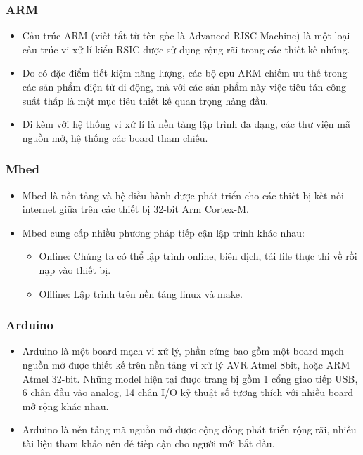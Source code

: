 \documentclass[a4paper,12pt,oneside]{article}
\begin{document}
\subsubsection{ARM \cite{arm}}
\begin{itemize}
\item Cấu trúc ARM (viết tắt từ tên gốc là Advanced RISC Machine) là một loại cấu trúc vi xử lí kiểu RSIC được sử dụng rộng rãi trong các thiết kế nhúng.
\item Do có đặc điểm tiết kiệm năng lượng, các bộ cpu ARM chiếm ưu thế trong các sản phẩm điện tử di động, mà với các sản phẩm này việc tiêu tán công suất thấp là một mục tiêu thiết kế quan trọng hàng đầu.
\item Đi kèm với hệ thống vi xử lí là nền tảng lập trình đa dạng, các thư viện mã nguồn mở, hệ thống các board tham chiếu.
\end{itemize}

\subsubsection{Mbed \cite{mbed}}
\begin{itemize}
\item Mbed là nền tảng và hệ điều hành được phát triển cho các thiết bị kết nối internet giữa trên các thiết bị 32-bit Arm Cortex-M.
\item Mbed cung cấp nhiều phương pháp tiếp cận lập trình khác nhau:
\begin{itemize}
	\item Online: Chúng ta có thể lập trình online, biên dịch, tải file thực thi về rồi nạp vào thiết bị.
	\item Offline: Lập trình trên nền tảng linux và make.
\end{itemize}
\end{itemize}

\subsubsection{Arduino \cite{arduino}}
\begin{itemize}
\item Arduino là một board mạch vi xử lý, phần cứng bao gồm một board mạch nguồn mở được thiết kế trên nền tảng vi xử lý AVR Atmel 8bit, hoặc ARM Atmel 32-bit. Những model hiện tại được trang bị gồm 1 cổng giao tiếp USB, 6 chân đầu vào analog, 14 chân I/O kỹ thuật số tương thích với nhiều board mở rộng khác nhau.
\item Arduino là nền tảng mã nguồn mở được cộng đồng phát triển rộng rãi, nhiều tài liệu tham khảo nên dễ tiếp cận cho người mới bắt đầu.
\end{itemize}
\end{document}
